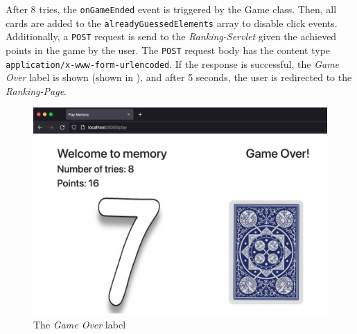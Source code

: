 \newpage
After 8 tries, the \texttt{onGameEnded} event is triggered by the Game class. Then, all cards are added to the \texttt{alreadyGuessedElements} array to disable click events. Additionally, a \texttt{POST} request is send to the \textit{Ranking-Servlet} given the achieved points in the game by the user. The \texttt{POST} request body has the content type \texttt{application/x-www-form-urlencoded}. If the response is successful, the \textit{Game Over} label is shown (shown in ), and after 5 seconds, the user is redirected to the \textit{Ranking-Page}.
\begin{figure}[h]
\centering
\includegraphics[scale=0.2]{images/03_impl/frontend/game-over}
\caption{The \textit{Game Over} label}
\label{fig:03_impl_frontend_memGame_gameOver}
\end{figure}
